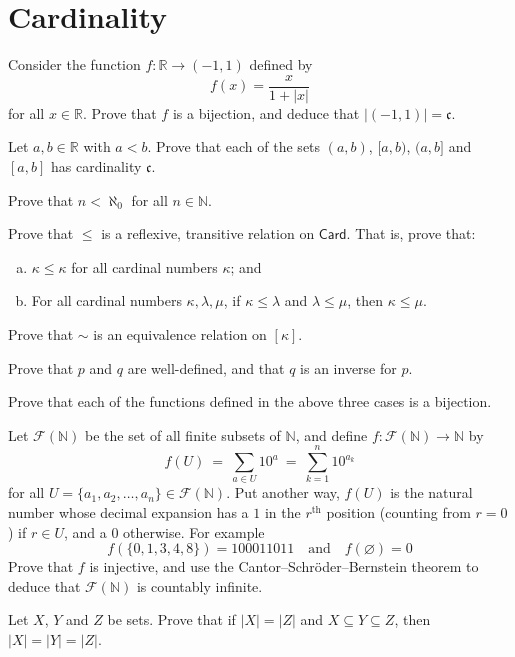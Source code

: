 \section{Cardinality}


\begin{exercise}
\label{exIntervalFromMinusOneToOneHasCardinalityOfContinuum}
Consider the function $f : \mathbb{R} \to (-1,1)$ defined by
\[ f(x) = \dfrac{x}{1+|x|} \]
for all $x \in \mathbb{R}$. Prove that $f$ is a bijection, and deduce that $|(-1,1)| = \mathfrak{c}$.
\end{exercise}

\begin{exercise}
\label{exRealsHaveSameCardinalityAsIntervals}
Let $a,b \in \mathbb{R}$ with $a<b$. Prove that each of the sets $(a,b)$, $[a,b)$, $(a,b]$ and $[a,b]$ has cardinality $\mathfrak{c}$.
\end{exercise}

\begin{exercise}
Prove that $n < \aleph_0$ for all $n \in \mathbb{N}$.
\end{exercise}

\begin{exercise}
Prove that $\le$ is a reflexive, transitive relation on $\mathsf{Card}$. That is, prove that:
\begin{enumerate}[(a)]
\item $\kappa \le \kappa$ for all cardinal numbers $\kappa$; and
\item For all cardinal numbers $\kappa, \lambda, \mu$, if $\kappa \le \lambda$ and $\lambda \le \mu$, then $\kappa \le \mu$.
\end{enumerate}
\end{exercise}

\begin{exercise}
Prove that $\sim$ is an equivalence relation on $[\kappa]$.
\end{exercise}

\begin{exercise}
Prove that $p$ and $q$ are well-defined, and that $q$ is an inverse for $p$.
\end{exercise}


\begin{exercise}
Prove that each of the functions defined in the above three cases is a bijection.
\end{exercise}


\begin{exercise}
Let $\mathcal{F}(\mathbb{N})$ be the set of all finite subsets of $\mathbb{N}$, and define $f : \mathcal{F}(\mathbb{N}) \to \mathbb{N}$ by
\[ f(U) ~=~ \sum_{a \in U} 10^a ~=~ \sum_{k = 1}^n 10^{a_k} \]
for all $U = \{ a_1, a_2, \dots, a_n \} \in \mathcal{F}(\mathbb{N})$. Put another way, $f(U)$ is the natural number whose decimal expansion has a $1$ in the $r^{\text{th}}$ position (counting from $r=0$) if $r \in U$, and a $0$ otherwise. For example
\[ f(\{ 0, 1, 3, 4, 8 \}) = 100011011 \quad \text{and} \quad f(\varnothing) = 0 \]
Prove that $f$ is injective, and use the Cantor--Schr\"{o}der--Bernstein theorem to deduce that $\mathcal{F}(\mathbb{N})$ is countably infinite.
\end{exercise}

\begin{exercise}
Let $X$, $Y$ and $Z$ be sets. Prove that if $|X| = |Z|$ and $X \subseteq Y \subseteq Z$, then $|X| = |Y| = |Z|$.
\end{exercise}